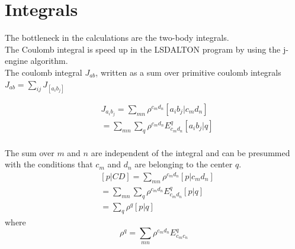 \documentclass[12pt,a4paper,english]{beamer}
\begin{document}
\section{Integrals} \begin{frame} The bottleneck in the calculations are the
        two-body integrals. \\
        \vspace{\baselineskip}
        The Coulomb integral is speed up in the LSDALTON program by using the 
        j-engine algorithm. \\
        \vspace{\baselineskip}
        The coulomb integral $J_{ab}$, written as a sum over primitive coulomb integrals
        $J_{ab}=\sum_{ij}J_{[a_ib_j]}$
                
        \begin{equation}
        \begin{split}
                &J_{a_ib_j}=\sum_{mn}\rho^{c_md_n}[a_ib_j|c_md_n]\\
                &=\sum_{mn}\sum_q\rho^{c_md_n}E^q_{c_md_n}[a_ib_j|q]\\
        \end{split}
        \end{equation}
\end{frame}
\begin{frame}
        The sum over $m$ and $n$ are independent of the integral and can be presummed with the conditions that $c_m$ and $d_n$ are belonging to the center $q$.
        \begin{equation}
                \begin{split}
                        &[p|CD]=\sum_{mn}\rho^{c_md_n}[p|c_md_n]\\
                        &=\sum_{mn}\sum_q\rho^{c_md_n}E^q_{c_md_n}[p|q]\\
                        &=\sum_q\rho^q[p|q]
                \end{split}
                \label{}
        \end{equation}
        where
        \begin{equation}
                \rho^q=\sum_{mn}\rho^{c_md_n}E^q_{c_mc_n}
                \label{}
        \end{equation}
\end{frame}
\end{document}
